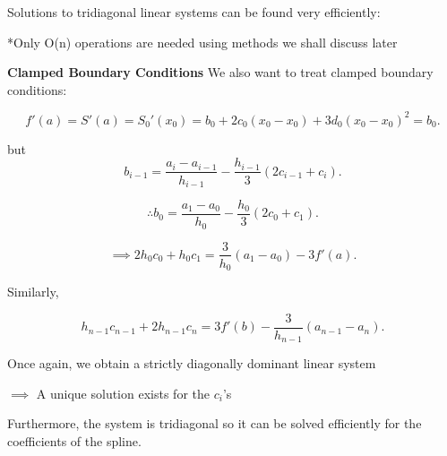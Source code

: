 Solutions to tridiagonal linear systems can be found very efficiently:

*Only O(n) operations are needed using methods we shall discuss later

\textbf{Clamped Boundary Conditions}
We also want to treat clamped boundary conditions:

\[
f'(a) = S'(a) = S_0'(x_0) = b_0 + 2c_0 (x_0-x_0) + 3d_0 (x_0-x_0)^2 = b_0
.\]

but 
\[
  b_{i-1} = \frac{a_i - a_{i-1}}{h_{i-1}} - \frac{h_{i-1}}{3}(2c_{i-1} + c_i)
.\]

\[
\therefore b_0 = \frac{a_1 - a_0}{h_0} - \frac{h_0}{3}(2c_0 + c_1)
.\]

\[
\implies 2h_0c_0 + h_0 c_1 = \frac{3}{h_0}(a_1 - a_0) - 3f'(a)
.\]

Similarly, 

\[
  h_{n-1} c_{n-1} + 2h_{n-1} c_n = 3f'(b) - \frac{3}{h_{n-1}}(a_{n-1} - a_n)
.\]

Once again, we obtain a strictly diagonally dominant linear system

\begin{center}
  $\implies$ A unique solution exists for the $c_i$'s
\end{center}

Furthermore, the system is tridiagonal so it can be solved efficiently for the
coefficients of the spline.

